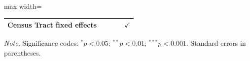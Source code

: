 \begin{table}[tp]
\begin{adjustbox}{max width=\textwidth}
\begin{tabular}{lcccc}
      Census Tract fixed effects            &                         &                 &                  & $\checkmark$\\   
      \bottomrule
   \end{tabular}
   \end{adjustbox}
   \vspace{0.8em}
   \begin{minipage}{\textwidth}
      \small\textit{Note.} Significance codes: $^{*}p<0.05$;\; $^{**}p<0.01$;\; $^{***}p<0.001$. Standard errors in parentheses.
   \end{minipage}
\end{table}


